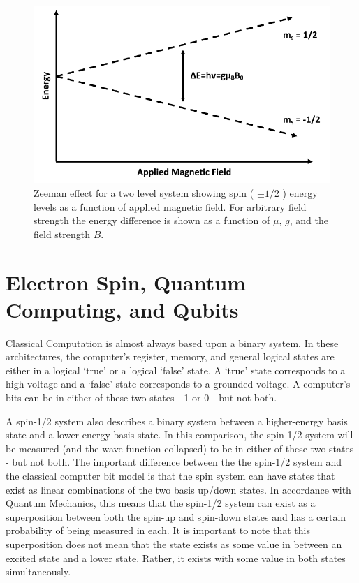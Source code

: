 \documentclass[oneside, astronomy, noacknowlegments]{BYUPhys}
\begin{document}
\begin{figure}
    \centerline{\includegraphics{zeeman_fig}}
    \caption[Zeeman effect and resonant conditions in matter]{\label{fig:Zeeman}
     Zeeman effect for a two level system showing spin ( $\pm 1/2$ ) energy levels as a function of applied magnetic field. For arbitrary field strength the energy difference is shown as a function of $\mu$, $g$, and the field strength $B$.}
\end{figure}

\section{Electron Spin, Quantum Computing, and Qubits}

Classical Computation is almost always based upon a binary system. In these architectures, the computer's register, memory, and general logical states are either in a logical `true' or a logical `false' state. A `true' state corresponds to a high voltage and a `false' state corresponds to a grounded voltage. A computer's bits can be in either of these two states - 1 or 0 - but not both.

A spin-1/2 system also describes a binary system between a higher-energy basis state and a lower-energy basis state. In this comparison, the spin-1/2 system will be measured (and the wave function collapsed) to be in either of these two states - but not both. The important difference between the the spin-1/2 system and the classical computer bit model is that the spin system can have states that exist as linear combinations of the two basis up/down states. In accordance with Quantum Mechanics, this means that the spin-1/2 system can exist as a superposition between both the spin-up and spin-down states and has a certain probability of being measured in each. It is important to note that this superposition does not mean that the state exists as some value in between an excited state and a lower state. Rather, it exists with some value in both states simultaneously.
\end{document}
